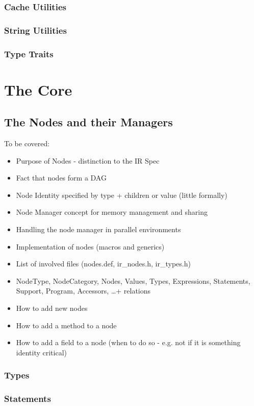 \subsubsection{Cache Utilities}
\subsubsection{String Utilities}
\subsubsection{Type Traits}

\section{The Core}
\subsection{The Nodes and their Managers}

To be covered:
\begin{itemize}
  \item Purpose of Nodes - distinction to the IR Spec
  \item Fact that nodes form a DAG
  \item Node Identity specified by type + children or value (little formally)
  \item Node Manager concept for memory management and sharing
  \item Handling the node manager in parallel environments
  \item Implementation of nodes (macros and generics)
  \item List of involved files (nodes.def, ir\_nodes.h, ir\_types.h)
  \item NodeType, NodeCategory, Nodes, Values, Types, Expressions, Statements,
  Support, Program, Accessors, \ldots + relations
  \item How to add new nodes
  \item How to add a method to a node
  \item How to add a field to a node (when to do so - e.g. not if it is
  something identity critical)
\end{itemize}

\subsubsection{Types}
\subsubsection{Statements}
